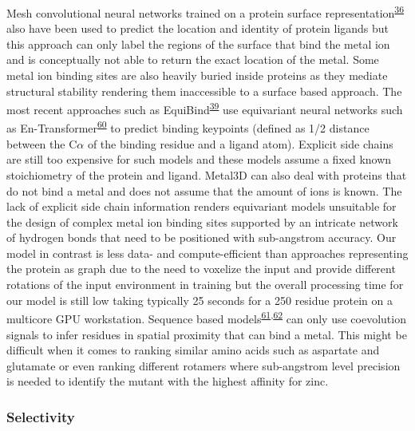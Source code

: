 \documentclass[  ASAPversion,
  ,
  9pt]{elife}
\begin{document}
Mesh convolutional neural networks trained on a protein surface representation\textsuperscript{\protect\hyperlink{ref-yBhqGkBa}{36}} also have been used to predict the location and identity of protein ligands but this approach can only label the regions of the surface that bind the metal ion and is conceptually not able to return the exact location of the metal. Some metal ion binding sites are also heavily buried inside proteins as they mediate structural stability rendering them inaccessible to a surface based approach. The most recent approaches such as EquiBind\textsuperscript{\protect\hyperlink{ref-13hjzBbje}{39}} use equivariant neural networks such as En-Transformer\textsuperscript{\protect\hyperlink{ref-Fc42fl1x}{60}} to predict binding keypoints (defined as 1/2 distance between the C$\alpha$ of the binding residue and a ligand atom). Explicit side chains are still too expensive for such models and these models assume a fixed known stoichiometry of the protein and ligand. Metal3D can also deal with proteins that do not bind a metal and does not assume that the amount of ions is known. The lack of explicit side chain information renders equivariant models unsuitable for the design of complex metal ion binding sites supported by an intricate network of hydrogen bonds that need to be positioned with sub-angstrom accuracy. Our model in contrast is less data- and compute-efficient than approaches representing the protein as graph due to the need to voxelize the input and provide different rotations of the input environment in training but the overall processing time for our model is still low taking typically 25 seconds for a 250 residue protein on a multicore GPU workstation.
Sequence based models\textsuperscript{\protect\hyperlink{ref-cbwvbkS6}{61},\protect\hyperlink{ref-Gj0pG9O5}{62}} can only use coevolution signals to infer residues in spatial proximity that can bind a metal. This might be difficult when it comes to ranking similar amino acids such as aspartate and glutamate or even ranking different rotamers where sub-angstrom level precision is needed to identify the mutant with the highest affinity for zinc.

\hypertarget{selectivity}{%
\subsubsection{Selectivity}\label{selectivity}}
\end{document}
